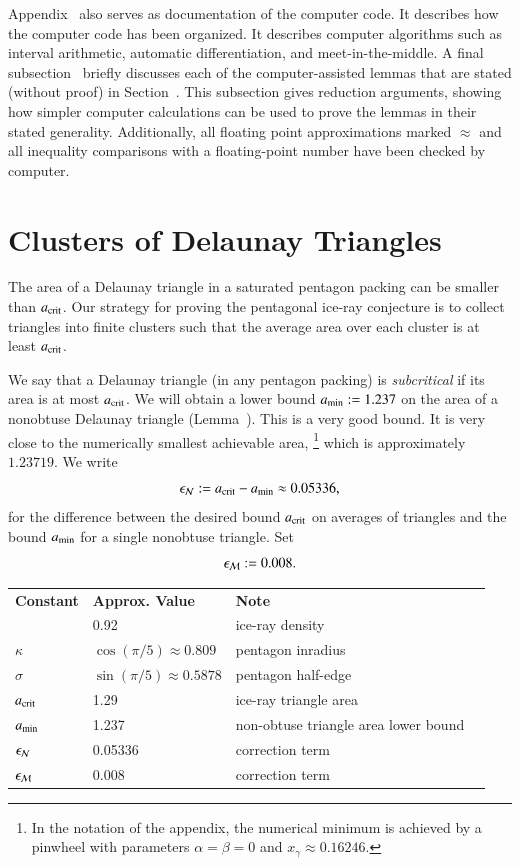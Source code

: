 Appendix~ also serves as documentation of the
computer code.  It describes how the computer code has been
organized. It describes computer algorithms such as interval
arithmetic, automatic differentiation, and meet-in-the-middle.  A
final subsection~ briefly discusses each of the
computer-assisted lemmas that are stated (without proof) in
Section~.  This subsection gives reduction arguments,
showing how simpler computer calculations can be used to prove the
lemmas in their stated generality.
Additionally, all floating point
approximations marked $\approx$ and all inequality comparisons with a floating-point number have been checked by computer.

\section{Clusters of Delaunay Triangles}

The area of a Delaunay triangle in a saturated pentagon packing can be
smaller than $a_\text{crit}$.  Our strategy for proving the pentagonal
ice-ray conjecture is to collect triangles into finite clusters such
that the average area over each cluster is at least $a_\text{crit}$.

We say that a Delaunay triangle (in any pentagon packing) is {\it
  subcritical} if its area is at most $a_\text{crit}$.  We will obtain a
lower bound $a_\text{min} := 1.237$ on the area of a nonobtuse Delaunay
triangle (Lemma~).  This is a very good bound.  It is
very close to the numerically smallest achievable area,%
\footnote{In the notation of the appendix, the
  numerical minimum is achieved by a pinwheel with parameters
  $\alpha=\beta=0$ and $x_\gamma\approx 0.16246$.}
 which is
approximately $1.23719$.  We write 
\begin{equation}\libel{eqn:epsN}
\epsN :=
\acrit - \ao \approx 0.05336,
\end{equation} for the difference between the desired
bound $a_\text{crit}$ on averages of triangles and the bound $a_\text{min}$ for a
single nonobtuse triangle.  Set
\begin{equation}\libel{eqn:epsM}
\epsM := 0.008.
\end{equation}

\bigskip
{}%
{
\begin{tabular}{llll}
{\bf Constant} & {\bf Approx. Value} & {\bf Note} \\
& 0.92 & ice-ray density\\
$\kappa$ & $\cos(\pi/5)\approx 0.809$ & pentagon inradius \\
$\sigma$ &$\sin(\pi/5)\approx 0.5878$ & pentagon half-edge \\
$a_\text{crit}$ &1.29 & ice-ray triangle area\\
$a_\text{min}$ & 1.237 & non-obtuse triangle area lower bound\\
$\epsilon_{\mathcal N}$ & 0.05336 & correction term\\
$\epsilon_{\mathcal M}$ & 0.008 & correction term\\
\end{tabular}
}

